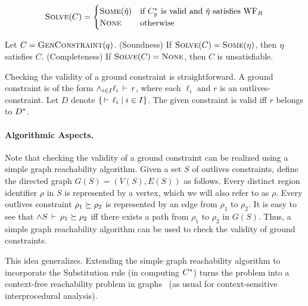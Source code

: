
\[
\textsc{Solve}(C) = 
\begin{cases}
\textsc{Some} (\hat{\eta}) & \textrm{if ${C}^*_g$ is valid and $\hat{\eta}$ satisfies $\text{WF}_R$} \\
\textsc{None} & \textrm{otherwise}
\end{cases}
\]

\begin{theorem}
\label{thm:constraint-solver-sc}
Let $C = \textsc{GenConstraint}(q)$.
(Soundness) If $\textsc{Solve}(C) = \textsc{Some}(\eta)$, then $\eta$ satisfies $C$.
(Completeness) If $\textsc{Solve}(C) = \textsc{None}$, then $C$ is unsatisfiable.
\end{theorem}

Checking the validity of a ground constraint is straightforward.
A ground constraint is of the form $\wedge_{i \in I} \ell_i\,\vdash\,r$, where each
$\ell_i$ and $r$ is an outlives-constraint.
Let $D$ denote $\{ \,\vdash\,\ell_i \;|\; i \in I \}$.
The given constraint is valid iff $r$ belongs to ${D}^*$.

\paragraph{Algorithmic Aspects.}
Note that checking the validity of a ground constraint can be realized using
a simple graph reachability algorithm.
%
Given a set $S$ of outlives constraints, define the directed
graph $G(S)=(V(S),E(S))$ as follows.
Every distinct region identifier $\rho$ in $S$ is represented by a vertex,
which we will also refer to as $\rho$.
Every outlives constraint $\rho_1 \succeq \rho_2$ is represented by
an edge from $\rho_1$ to $\rho_2$.
%
%
It is easy to see that $\wedge S\,\vdash\,\rho_1 \succeq \rho_2$ iff
there exists a path from $\rho_1$ to $\rho_2$ in $G(S)$.
%
Thus, a simple graph reachability algorithm can be used to check the validity of
ground constraints.

This idea generalizes.
Extending the simple graph reachability algorithm to incorporate the Substitution rule
(in computing ${C}^*$) turns the problem into a context-free reachability problem in graphs~\cite{Reps:Reachability}
(as usual for context-sensitive interprocedural analysis).

